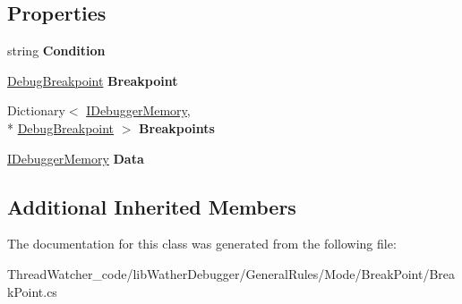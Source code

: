 \subsection*{Properties}
\begin{DoxyCompactItemize}
\item 
\hypertarget{class_watcher_1_1_debugger_1_1_general_rules_1_1_mode_1_1_break_point_1_1_breakpoint_rule_a7cc3a4e59270bfbca6f900c1c3f184af}{string {\bfseries Condition}}\label{class_watcher_1_1_debugger_1_1_general_rules_1_1_mode_1_1_break_point_1_1_breakpoint_rule_a7cc3a4e59270bfbca6f900c1c3f184af}

\item 
\hypertarget{class_watcher_1_1_debugger_1_1_general_rules_1_1_mode_1_1_break_point_1_1_breakpoint_rule_addf786b2609c682835fc5c0f8da8f6c1}{\hyperlink{classlib_wather_debugger_1_1_breakpoint_1_1_debug_breakpoint}{Debug\+Breakpoint} {\bfseries Breakpoint}}\label{class_watcher_1_1_debugger_1_1_general_rules_1_1_mode_1_1_break_point_1_1_breakpoint_rule_addf786b2609c682835fc5c0f8da8f6c1}

\item 
\hypertarget{class_watcher_1_1_debugger_1_1_general_rules_1_1_mode_1_1_break_point_1_1_breakpoint_rule_a8b1b5bbb996fab1dc39c441db7db4a75}{Dictionary$<$ \hyperlink{interfacelib_utilities_1_1_i_debugger_memory}{I\+Debugger\+Memory}, \\*
\hyperlink{classlib_wather_debugger_1_1_breakpoint_1_1_debug_breakpoint}{Debug\+Breakpoint} $>$ {\bfseries Breakpoints}}\label{class_watcher_1_1_debugger_1_1_general_rules_1_1_mode_1_1_break_point_1_1_breakpoint_rule_a8b1b5bbb996fab1dc39c441db7db4a75}

\item 
\hypertarget{class_watcher_1_1_debugger_1_1_general_rules_1_1_mode_1_1_break_point_1_1_breakpoint_rule_ad2bb570449be5a2ead7cb78572b7f3aa}{\hyperlink{interfacelib_utilities_1_1_i_debugger_memory}{I\+Debugger\+Memory} {\bfseries Data}}\label{class_watcher_1_1_debugger_1_1_general_rules_1_1_mode_1_1_break_point_1_1_breakpoint_rule_ad2bb570449be5a2ead7cb78572b7f3aa}

\end{DoxyCompactItemize}
\subsection*{Additional Inherited Members}


The documentation for this class was generated from the following file\+:\begin{DoxyCompactItemize}
\item 
Thread\+Watcher\+\_\+code/lib\+Wather\+Debugger/\+General\+Rules/\+Mode/\+Break\+Point/Break\+Point.\+cs\end{DoxyCompactItemize}
